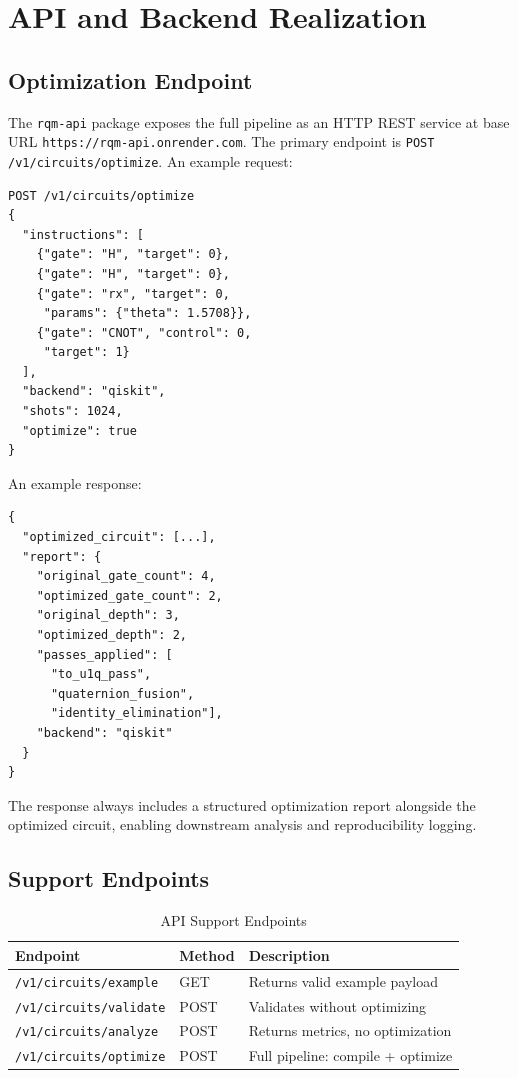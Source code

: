 \documentclass[conference]{IEEEtran}
\begin{document}
\section{API and Backend Realization}

\subsection{Optimization Endpoint}

The \texttt{rqm-api} package exposes the full pipeline as an HTTP REST service at base URL
\texttt{https://rqm-api.onrender.com}. The primary endpoint is
\texttt{POST /v1/circuits/optimize}. An example request:

\begin{lstlisting}[language={}]
POST /v1/circuits/optimize
{
  "instructions": [
    {"gate": "H", "target": 0},
    {"gate": "H", "target": 0},
    {"gate": "rx", "target": 0,
     "params": {"theta": 1.5708}},
    {"gate": "CNOT", "control": 0,
     "target": 1}
  ],
  "backend": "qiskit",
  "shots": 1024,
  "optimize": true
}
\end{lstlisting}

An example response:

\begin{lstlisting}[language={}]
{
  "optimized_circuit": [...],
  "report": {
    "original_gate_count": 4,
    "optimized_gate_count": 2,
    "original_depth": 3,
    "optimized_depth": 2,
    "passes_applied": [
      "to_u1q_pass",
      "quaternion_fusion",
      "identity_elimination"],
    "backend": "qiskit"
  }
}
\end{lstlisting}

The response always includes a structured optimization report alongside the optimized circuit,
enabling downstream analysis and reproducibility logging.

\subsection{Support Endpoints}

\begin{table}[htbp]
\caption{API Support Endpoints}
\begin{center}
\begin{tabular}{lll}
\toprule
\textbf{Endpoint} & \textbf{Method} & \textbf{Description} \\
\midrule
\texttt{/v1/circuits/example}  & GET  & Returns valid example payload \\
\texttt{/v1/circuits/validate} & POST & Validates without optimizing \\
\texttt{/v1/circuits/analyze}  & POST & Returns metrics, no optimization \\
\texttt{/v1/circuits/optimize} & POST & Full pipeline: compile + optimize \\
\bottomrule
\end{tabular}
\label{tab:endpoints}
\end{center}
\end{table}
\end{document}

